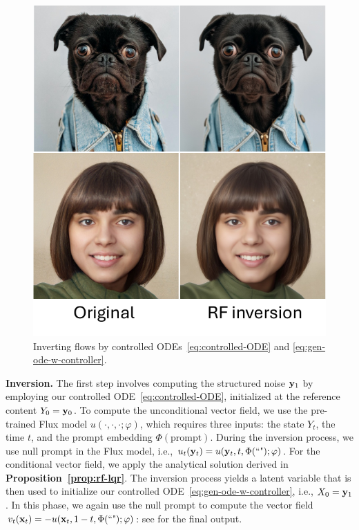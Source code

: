 \documentclass{article} %
\theoremstyle{plain}
\begin{document}
\begin{figure}
\includegraphics[width=\linewidth]{pics/rf-inv-teaser-1.pdf}
\caption{
Inverting flows by controlled ODEs~\eqref{eq:controlled-ODE} and \eqref{eq:gen-ode-w-controller}.
}
\vspace{-2ex}  
\label{fig:rf-inv-teaser}
\end{figure}
\textbf{Inversion.} The first step involves computing the structured noise ${\mathbf{y}}_1$ by employing our controlled ODE~\eqref{eq:controlled-ODE}, initialized at the reference content $Y_0 = {\mathbf{y}}_0$. 
To compute the unconditional vector field, we use the pre-trained Flux model $u\left(\cdot,\cdot,\cdot;\varphi \right)$, which requires three inputs: the state $Y_t$, the time $t$, and the prompt embedding $\Phi(\text{prompt})$.
During the inversion process, we use null prompt in the Flux model, i.e., $u_t({\mathbf{y}}_t) = u({\mathbf{y}}_t, t,\Phi(\text{``"});\varphi)$.
For the conditional vector field, we apply the analytical solution derived in \textbf{Proposition~\ref{prop:rf-lqr}}.
The inversion process yields a latent variable that is then used to initialize our controlled ODE~\eqref{eq:gen-ode-w-controller}, i.e., $X_0 = {\mathbf{y}}_1$.
In this phase, we again use the null prompt to compute the vector field $v_t({\mathbf{x}}_t) = -u({\mathbf{x}}_t, 1-t,\Phi(\text{``"});\varphi)$: see  for the final output.
\end{document}
